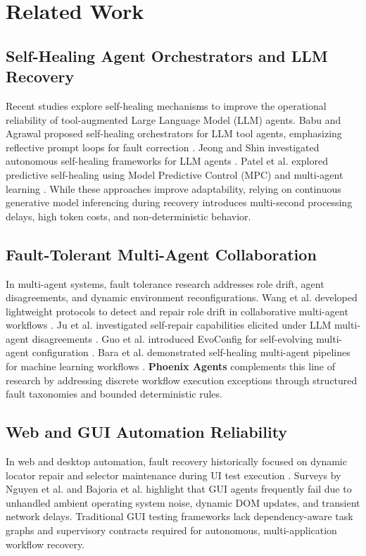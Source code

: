 \documentclass[conference]{IEEEtran}
\begin{document}
\section{Related Work}
\label{sec:related}

\subsection{Self-Healing Agent Orchestrators and LLM Recovery}
Recent studies explore self-healing mechanisms to improve the operational reliability of tool-augmented Large Language Model (LLM) agents. Babu and Agrawal proposed self-healing orchestrators for LLM tool agents, emphasizing reflective prompt loops for fault correction \cite{babu2026}. Jeong and Shin investigated autonomous self-healing frameworks for LLM agents \cite{jeong2026}. Patel et al. explored predictive self-healing using Model Predictive Control (MPC) \cite{patel2026sustech} and multi-agent learning \cite{patel2026isiber}. While these approaches improve adaptability, relying on continuous generative model inferencing during recovery introduces multi-second processing delays, high token costs, and non-deterministic behavior.

\subsection{Fault-Tolerant Multi-Agent Collaboration}
In multi-agent systems, fault tolerance research addresses role drift, agent disagreements, and dynamic environment reconfigurations. Wang et al. developed lightweight protocols to detect and repair role drift in collaborative multi-agent workflows \cite{wang2026}. Ju et al. investigated self-repair capabilities elicited under LLM multi-agent disagreements \cite{ju2025}. Guo et al. introduced EvoConfig for self-evolving multi-agent configuration \cite{guo2026}. Bara et al. demonstrated self-healing multi-agent pipelines for machine learning workflows \cite{bara2026}. \textbf{Phoenix Agents} complements this line of research by addressing discrete workflow execution exceptions through structured fault taxonomies and bounded deterministic rules.

\subsection{Web and GUI Automation Reliability}
In web and desktop automation, fault recovery historically focused on dynamic locator repair and selector maintenance during UI test execution \cite{garcia2026}. Surveys by Nguyen et al. \cite{nguyen2025} and Bajoria et al. \cite{bajoria2026} highlight that GUI agents frequently fail due to unhandled ambient operating system noise, dynamic DOM updates, and transient network delays. Traditional GUI testing frameworks lack dependency-aware task graphs and supervisory contracts required for autonomous, multi-application workflow recovery.
\end{document}
